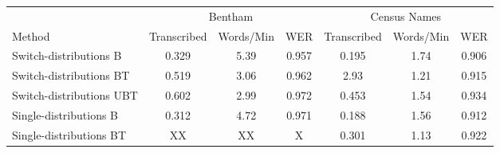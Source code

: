 \documentclass[ms,electronic,twosidetoc,letterpaper,chaptercenter,parttop,lof,lot]{byumsphd}
\begin{document}
\begin{table}
\centering
\begin{tabular}{| l | c c c | c c c |}
  \hline
   & \multicolumn{3}{c|}{Bentham} & \multicolumn{3}{c|}{Census Names}\\
  Method & Transcribed & Words/Min & WER & Transcribed & Words/Min & WER\\
  \hline  
  Switch-distributions B & 0.329 & 5.39 & 0.957 &  0.195 & 1.74 & 0.906 \\
  Switch-distributions BT & 0.519 & 3.06 & 0.962 & 2.93 & 1.21 & 0.915  \\
  Switch-distributions UBT & 0.602 & 2.99 & 0.972 & 0.453 & 1.54 & 0.934 \\
  Single-distributions B & 0.312 & 4.72 & 0.971 & 0.188 & 1.56 & 0.912 \\
  Single-distributions BT & XX & XX & X & 0.301 & 1.13 & 0.922 \\

\end{tabular}
\end{table}
\end{document}
